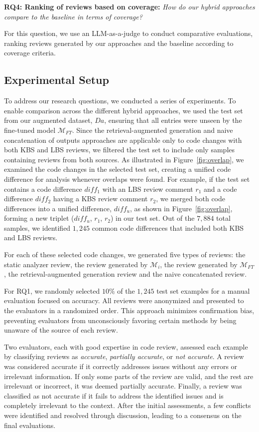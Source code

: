 \textbf{RQ4: Ranking of reviews based on coverage:}
\emph{How do our hybrid approaches compare to the baseline in terms of  coverage?}

For this question, we use an LLM-as-a-judge to conduct comparative evaluations, ranking reviews generated by our approaches and the baseline according to coverage criteria.





\subsection{Experimental Setup}
To address our research questions, we conducted a series of experiments. To enable comparison across the different hybrid approaches, we used the test set from our augmented dataset, \(Da\), ensuring that all entries were unseen by the fine-tuned model \(\mathcal{M}_{FT}\). 
Since the retrieval-augmented generation and naive concatenation of outputs approaches are applicable only to code changes with both KBS and LBS reviews, we filtered the test set to include only samples containing reviews from both sources. As illustrated in Figure~\ref{fig:overlap}, we examined the code changes in the selected test set, creating a unified code difference for analysis whenever overlaps were found. For example, if the test set contains a code difference $diff_1$ with an LBS review comment $r_1$ and a code difference $diff_2$ having a KBS review comment $r_2$, we merged both code differences into a unified difference, $diff_u$, as shown in Figure~\ref{fig:overlap}, forming a new triplet ($diff_u$, $r_1$, $r_2$) in our test set. Out of the $7,884$ total samples, we identified $1,245$ common code differences that included both KBS and LBS reviews.

For each of these selected code changes, we generated five types of reviews: the static analyzer review, the review generated by \(\mathcal{M}_i\), the review generated by \(\mathcal{M}_{FT}\), the retrieval-augmented generation review and the naive concatenated review.


For RQ1, we randomly selected $10\%$ of the $1,245$ test set examples for a manual evaluation focused on accuracy. All reviews were anonymized and presented to the evaluators in a randomized order. This approach minimizes confirmation bias, preventing evaluators from unconsciously favoring certain methods by being unaware of the source of each review.

Two evaluators, each with good expertise in code review, assessed each example by classifying reviews as \emph{accurate}, \emph{partially accurate}, or \emph{not accurate}. A review was considered accurate if it correctly addresses issues without any errors or irrelevant information. If only some parts of the review are valid, and the rest are irrelevant or incorrect, it was deemed partially accurate. Finally, a review was classified as not accurate if it fails to address the identified issues and is completely irrelevant to the context. After the initial assessments, a few conflicts were identified and resolved through discussion, leading to a consensus on the final evaluations.

